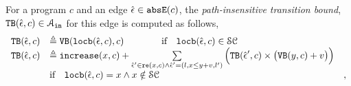 \begin{enumerate}
\begin{defn}
 \label{def:edge_pathinsensitivebound}
 For a program $c$ and an edge $\hat{\mathtt{\epsilon}{}} \in \mathtt{abs}{\mathtt{E}}(c)$, the \emph{path-insensitive transition bound},
 ${\mathtt{TB}}(\hat{\mathtt{\epsilon}{}}, c) \in \mathcal{A}_{\mathtt{in}}$ 
for this edge is
computed as follows,
\[ 
\begin{array}{lll}
 {\ensuremath{\mathtt{TB}}}(\hat{\mathtt{\epsilon}{}}, c) 
 & \triangleq {\ensuremath{\mathtt{VB}}}(\mathtt{locb}(\hat{\mathtt{\epsilon}{}}, c), c) \qquad \qquad \text{if} \quad \mathtt{locb}(\hat{\mathtt{\epsilon}{}}, c) \in \mathcal{SC} & \\
 {\mathtt{TB}}(\hat{\mathtt{\epsilon}{}}, c) 
 & \triangleq \mathtt{increase}(x, c) 
 + 
 \sum\limits_{\hat{\mathtt{\epsilon}{}}' \in \mathtt{re}(x, c) \land \hat{\mathtt{\epsilon}{}}' = (l, x \leq y + v, l') }
 \Big( {\mathtt{TB}}(\hat{\mathtt{\epsilon}{}}', c) \times \big( {\mathtt{VB}}(y, c) + v \big) \Big)
 & \\
 & \text{if} \quad \mathtt{locb}(\hat{\mathtt{\epsilon}{}}, c) = x \land x \notin \mathcal{SC} & ,
\end{array}
 \]
\end{defn}


\end{enumerate}
